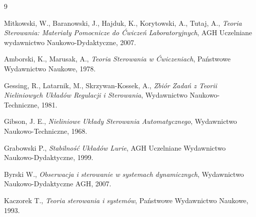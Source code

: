 \documentclass{article}
\begin{document}
\newpage
\begin{thebibliography}{9}

  Mitkowski, W., Baranowski, J., Hajduk, K., Korytowski, A., Tutaj, A.,
  \emph{Teoria Sterowania: Materiały Pomocnicze do Ćwiczeń Laboratoryjnych},
  AGH Uczelniane wydawnictwo Naukowo-Dydaktyczne,
  2007.

  Amborski, K., Marusak, A.,
  \emph{Teoria Sterowania w Ćwiczeniach},
  Państwowe Wydawnictwo Naukowe,
  1978.

  Gessing, R., Latarnik, M., Skrzywan-Kossek, A.,
  \emph{Zbiór Zadań z Teorii Nieliniowych Układów Regulacji i Sterowania},
  Wydawnictwo Naukowo-Techniczne,
  1981.

  Gibson, J. E.,
  \emph{Nieliniowe Układy Sterowania Automatycznego},
  Wydawnictwo Naukowo-Techniczne,
  1968.

  Grabowski P.,
  \emph{Stabilność Układów Lurie},
  AGH Uczelniane Wydawnictwo Naukowo-Dydaktyczne,
  1999.

  Byrski W.,
  \emph{Obserwacja i sterowanie w systemach dynamicznych},
  Wydawnictwo Naukowo-Dydaktyczne AGH,
  2007.

  Kaczorek T.,
  \emph{Teoria sterowania i systemów},
  Państwowe Wydawnictwo Naukowe,
  1993.

\end{thebibliography}
\end{document}

